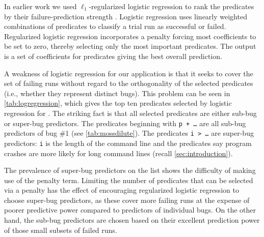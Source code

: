 In earlier work
we used $\ell_1$-regularized logistic regression
to rank the predicates by their
failure-prediction strength \cite{PLDI`03*141,NIPS2003_AP05}.
Logistic regression uses linearly weighted
combinations of predicates to classify a trial run as successful or
failed.  Regularized logistic regression incorporates a penalty
forcing most coefficients to be set to zero, thereby
selecting only the most important predicates.  The output is a set of
coefficients for predicates giving the best overall prediction.

A weakness of logistic regression for our application is that it seeks
to cover the set of failing runs without regard to the orthogonality
of the selected predicates (i.e., whether they represent distinct
bugs).  This problem can be seen in \autoref{tab:logregression},
which gives the top ten predicates selected by logistic regression
for \moss.  The striking fact is that all selected predicates are
either sub-bug or super-bug predictors.  The predicates beginning with
\texttt{p + \ldots} are all sub-bug predictors of bug \#1 (see
\autoref{tab:mossdilute}).  The predicates \texttt{i > \ldots} are
super-bug predictors: \texttt{i} is the length of the command line and
the predicates say program crashes are more likely for long command
lines (recall \autoref{sec:introduction}).

The prevalence of super-bug predictors on the list shows the
difficulty of making use of the penalty term.  Limiting the number of
predicates that can be selected via a penalty has the effect of
encouraging regularized logistic regression to choose super-bug predictors, as
these cover more failing runs at the expense of poorer predictive
power compared to predictors of individual bugs.  On the other hand,
the sub-bug predictors are chosen based on their excellent prediction
power of those small subsets of failed runs.

